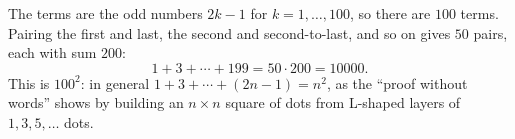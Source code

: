 The terms are the odd numbers $2k-1$ for $k=1,\dots,100$, so there are $100$ terms. Pairing the first and last, the second and second-to-last, and so on gives $50$ pairs, each with sum $200$:
\[
1+3+\cdots+199=50\cdot200=\boxed{10000}.
\]
This is $100^2$: in general $1+3+\cdots+(2n-1)=n^2$, as the ``proof without words'' shows by building an $n\times n$ square of dots from L-shaped layers of $1,3,5,\dots$ dots.

